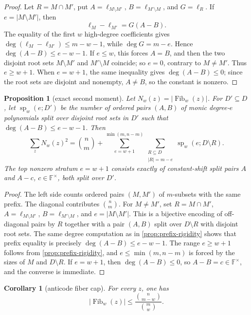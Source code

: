 \documentclass[a4paper,11pt]{amsart}
\newtheorem{proposition}[theorem]{Proposition}
\newtheorem{corollary}[theorem]{Corollary}
\theoremstyle{remark}
\newcommand{\F}{\mathbb F}
\newcommand{\Fib}{\operatorname{Fib}}
\begin{document}
\begin{proof}
Let \(R=M\cap M'\), put \(A=\ell_{M\setminus M'}\), \(B=\ell_{M'\setminus M}\), and \(G=\ell_R\).  If \(e=|M\setminus M'|\), then
\[
        \ell_M-\ell_{M'}=G(A-B).
\]
The equality of the first \(w\) high-degree coefficients gives \(\deg(\ell_M-\ell_{M'})\le m-w-1\), while \(\deg G=m-e\).  Hence \(\deg(A-B)\le e-w-1\).  If \(e\le w\), this forces \(A=B\), and then the two disjoint root sets \(M\setminus M'\) and \(M'\setminus M\) coincide; so \(e=0\), contrary to \(M\ne M'\).  Thus \(e\ge w+1\).  When \(e=w+1\), the same inequality gives \(\deg(A-B)\le0\); since the root sets are disjoint and nonempty, \(A\ne B\), so the constant is nonzero.
\end{proof}

\begin{proposition}[exact second moment]\label{prop:second-moment}
Let \(N_w(z)=|\Fib_w(z)|\).  For \(D'\subseteq D\), let \(\operatorname{sp}_w(e;D')\) be the number of ordered pairs \((A,B)\) of monic degree-\(e\) polynomials split over disjoint root sets in \(D'\) such that \(\deg(A-B)\le e-w-1\).  Then
\[
        \sum_z N_w(z)^2
        =
        \binom{n}{m}
        +
        \sum_{e=w+1}^{\min(m,n-m)}
        \sum_{\substack{R\subseteq D\\ |R|=m-e}}
        \operatorname{sp}_w(e;D\setminus R).
\]
The top nonzero stratum \(e=w+1\) consists exactly of constant-shift split pairs \(A\) and \(A-c\), \(c\in\F^\times\), both split over \(D'\).
\end{proposition}

\begin{proof}
The left side counts ordered pairs \((M,M')\) of \(m\)-subsets with the same prefix.  The diagonal contributes \(\binom{n}{m}\).  For \(M\ne M'\), set \(R=M\cap M'\), \(A=\ell_{M\setminus M'}\), \(B=\ell_{M'\setminus M}\), and \(e=|M\setminus M'|\).  This is a bijective encoding of off-diagonal pairs by \(R\) together with a pair \((A,B)\) split over \(D\setminus R\) with disjoint root sets.  The same degree computation as in \cref{prop:prefix-rigidity} shows that prefix equality is precisely \(\deg(A-B)\le e-w-1\).  The range \(e\ge w+1\) follows from \cref{prop:prefix-rigidity}, and \(e\le\min(m,n-m)\) is forced by the sizes of \(M\) and \(D\setminus R\).  If \(e=w+1\), then \(\deg(A-B)\le0\), so \(A-B=c\in\F^\times\), and the converse is immediate.
\end{proof}

\begin{corollary}[anticode fiber cap]\label{cor:anticode-cap}
For every \(z\), one has
\[
        |\Fib_w(z)|\le \frac{\binom{n}{m-w}}{\binom{m}{w}}.
\]
\end{corollary}
\end{document}
